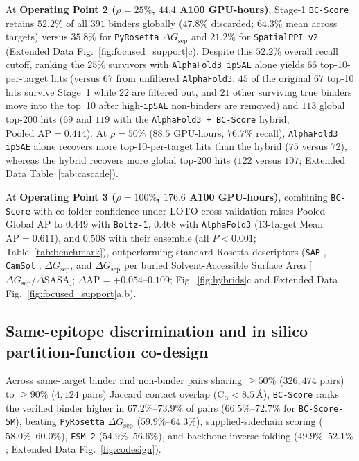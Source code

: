 \documentclass[10pt,twocolumn]{article}
\begin{document}
At \textbf{Operating Point 2 ($\rho = 25\%$, $44.4$ A100 GPU-hours)}, Stage-1 \texttt{BC-Score} retains $52.2\%$ of all $391$ binders globally ($47.8\%$ discarded; $64.3\%$ mean across targets) versus $35.8\%$ for \texttt{PyRosetta} $\Delta G_{\text{sep}}$ and $21.2\%$ for \texttt{SpatialPPI v2} (Extended Data Fig.~\ref{fig:focused_support}c). Despite this $52.2\%$ overall recall cutoff, ranking the $25\%$ survivors with \texttt{AlphaFold3 ipSAE} alone yields $66$ top-10-per-target hits (versus $67$ from unfiltered \texttt{AlphaFold3}: $45$ of the original $67$ top-10 hits survive Stage~1 while $22$ are filtered out, and $21$ other surviving true binders move into the top~10 after high-\texttt{ipSAE} non-binders are removed) and $113$ global top-200 hits ($69$ and $119$ with the \texttt{AlphaFold3 + BC-Score} hybrid, $\text{Pooled AP} = 0.414$). At $\rho = 50\%$ ($88.5$ GPU-hours, $76.7\%$ recall), \texttt{AlphaFold3 ipSAE} alone recovers more top-10-per-target hits than the hybrid ($75$ versus $72$), whereas the hybrid recovers more global top-200 hits ($122$ versus $107$; Extended Data Table~\ref{tab:cascade}).

At \textbf{Operating Point 3 ($\rho = 100\%$, $176.6$ A100 GPU-hours)}, combining \texttt{BC-Score} with co-folder confidence under LOTO cross-validation raises Pooled Global AP to $0.449$ with \texttt{Boltz-1}, $0.468$ with \texttt{AlphaFold3} (13-target Mean $\text{AP} = 0.611$), and $0.508$ with their ensemble (all $P < 0.001$; Table~\ref{tab:benchmark}), outperforming standard Rosetta descriptors (\texttt{SAP} \cite{chennamsetty2009sap}, \texttt{CamSol} \cite{sormanni2015camsol}, $\Delta G_{\text{sep}}$, and $\Delta G_{\text{sep}}$ per buried Solvent-Accessible Surface Area [$\Delta G_{\text{sep}}/\Delta\text{SASA}$]; $\Delta\text{AP} = +0.054\text{--}0.109$; Fig.~\ref{fig:hybrids}c and Extended Data Fig.~\ref{fig:focused_support}a,b).

\subsection{Same-epitope discrimination and in silico partition-function co-design}
Across same-target binder and non-binder pairs sharing $\ge 50\%$ ($326,474$ pairs) to $\ge 90\%$ ($4,124$ pairs) Jaccard contact overlap ($\text{C}_\alpha < 8.5\,\text{\AA}$), \texttt{BC-Score} ranks the verified binder higher in $67.2\%\text{--}73.9\%$ of pairs ($66.5\%\text{--}72.7\%$ for \texttt{BC-Score-5M}), beating \texttt{PyRosetta} $\Delta G_{\text{sep}}$ ($59.9\%\text{--}64.3\%$), supplied-sidechain scoring ($58.0\%\text{--}60.0\%$), \texttt{ESM-2} \cite{lin2023evolutionary} ($54.9\%\text{--}56.6\%$), and backbone inverse folding ($49.9\%\text{--}52.1\%$; Extended Data Fig.~\ref{fig:codesign}).
\end{document}
